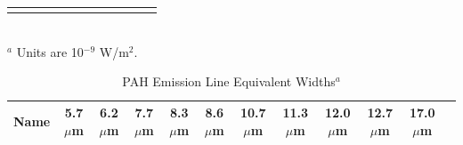 \begin{table}
\begin{minipage}{200mm}
\begin{tabular}{l c c  c  c  c  c  c  c  c  c c }
\hline
 \label{PAHlinetable}
\end{tabular}\\
{$^a$ Units are 10$^{-9}$ W/m$^2$.}
\end{minipage}
\end{table}







\begin{table}
 \centering
 \begin{minipage}{200mm}
\caption{PAH Emission Line Equivalent Widths$^a$}
  \begin{tabular}{l c c  c  c  c  c  c  c  c  c c }
  \hline {Name  }&{5.7$\mu$m  }&{6.2$\mu$m  }&{7.7$\mu$m  }&{8.3$\mu$m  }&{8.6$\mu$m  }&{10.7$\mu$m  }&{11.3$\mu$m  }&{12.0$\mu$m  }&{12.7$\mu$m  }&{17.0$\mu$m  } 
   \\
 \hline




\end{tabular}
\end{minipage}
\end{table}
